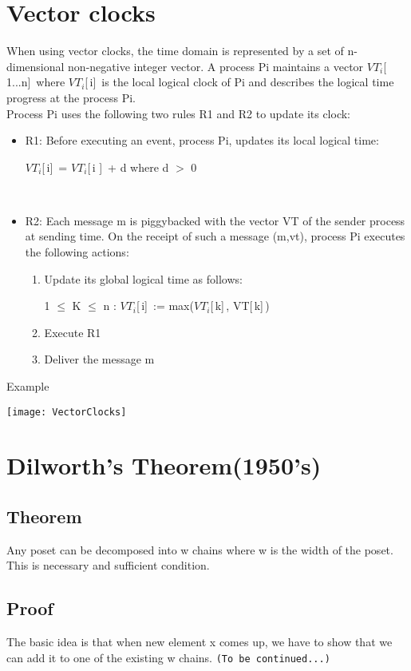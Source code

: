 \documentclass[twoside]{article}
\begin{document}
\section{Vector clocks}
When using vector clocks, the time domain is represented by a set of n-dimensional non-negative integer vector. A process Pi maintains a vector $VT_{i}$[\,1...n]\, where $VT_{i}$[\,i]\, is the local logical clock of Pi and describes the logical time progress at the process Pi.\\

Process Pi uses the following two rules R1 and R2 to update its clock:


\begin{itemize}
\item R1: Before executing an event, process Pi, updates its local logical time:\\
\centerline{$VT_{i}$[\,i]\, = $VT_{i}$[\,i ]\, + d where d  $>$ 0}\\
\item R2: Each message m is piggybacked with the vector VT of the sender process at sending time. On the receipt of such a message (m,vt), process Pi executes the following actions:
\begin{enumerate}
\item Update its global logical time as follows:\\
\centerline{1 $\leq$ K $\leq$ n : $VT_{i}$[\,i]\, := max($VT_{i}$[\,k]\,, VT[\,k]\,) }
\item Execute R1
\item Deliver the message m

\end{enumerate}




\end{itemize}
\newpage
Example
\begin{center}
\texttt{[image: VectorClocks]}\\
\end{center}

\section{Dilworth's Theorem(1950's)}
\subsection{Theorem}
Any poset can be decomposed into w chains where w is the width of the poset. This is necessary and sufficient condition.
\subsection{Proof}
The basic idea is that when new element x comes up, we have to show that we can add it to one of the existing w chains.
\newline
\tt(To be continued...) 
\end{document}
